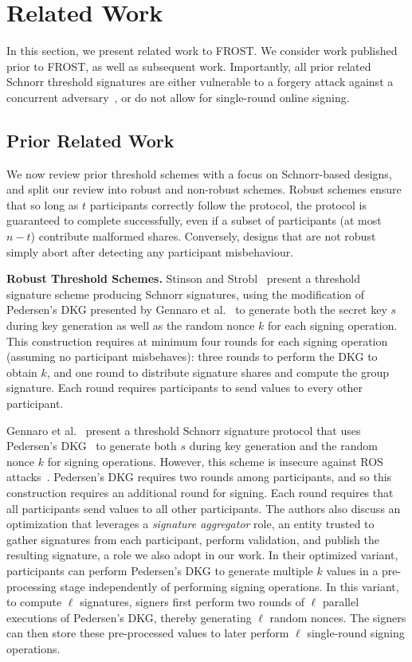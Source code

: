 \section{Related Work}
\label{frost-related-work}

In this section,
we present related work to FROST.
We consider work published prior to FROST,
as well as subsequent work.
Importantly,
all prior related Schnorr threshold signatures are either vulnerable to a forgery attack against a concurrent adversary~\cite{DrijversEFKLNS19},
or do not allow for single-round online signing.

\subsection{Prior Related Work}

We now review prior threshold schemes with a focus on Schnorr-based designs,
and split our review into robust and non-robust schemes. Robust schemes ensure that
so long as $t$ participants correctly follow the protocol, the protocol is
guaranteed to complete successfully, even if a subset of
participants (at most $n-t$) contribute malformed shares.
Conversely, designs that are not robust simply abort after detecting any
participant misbehaviour.

\textbf{Robust Threshold Schemes.} Stinson and Strobl~\cite{StinsonR01}
present a threshold signature scheme
producing Schnorr signatures, using the modification of Pedersen's DKG presented
by Gennaro et al.~\cite{GennaroJKR07} to generate
both the secret key $s$ during key generation as well as
the random nonce $k$ for each signing operation.
This construction
requires at minimum four rounds
for each signing operation (assuming no participant misbehaves): three rounds
to perform the DKG to obtain $k$,
and one
round to distribute signature shares and compute the group signature.
Each round requires participants to send values to every other participant.

Gennaro et al.~\cite{GennaroJKR03} present a threshold
Schnorr signature protocol that uses Pedersen's
DKG~\cite{Pedersen91} to generate both $s$ during key generation
and the random nonce $k$ for signing operations.
However, this scheme is insecure against ROS attacks~\cite{DrijversEFKLNS19}.
Pedersen's DKG requires two rounds among participants,
and so this construction requires an additional round for signing.
Each round requires that
all participants send values to all other participants.
The authors also discuss an optimization that leverages
a \emph{signature aggregator} role, an entity trusted to
gather signatures from each participant, perform validation, and publish the
resulting signature, a role we also adopt in our work.
In their optimized variant, participants can perform
Pedersen's DKG to generate multiple $k$ values in a pre-processing stage independently
of performing signing operations.
In this variant, to compute $\ell$ signatures, signers first perform two
rounds of $\ell$ parallel executions of Pedersen's DKG,
thereby generating $\ell$
random nonces. The signers can then store these pre-processed values to later perform
$\ell$ single-round signing operations.

